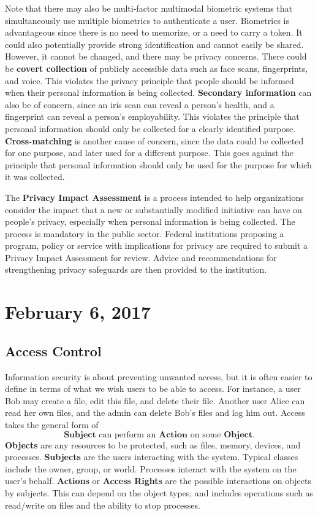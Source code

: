 \documentclass[11pt]{article}
\theoremstyle{plain} %
\theoremstyle{definition}
\theoremstyle{example}
\theoremstyle{remark}
\begin{document}
Note that there may also be multi-factor multimodal biometric systems that simultaneously use multiple biometrics to authenticate a user. Biometrics is advantageous since there is no need to memorize, or a need to carry a token. It could also potentially provide strong identification and cannot easily be shared. However, it cannot be changed, and there may be privacy concerns. There could be \textbf{covert collection} of publicly accessible data such as face scans, fingerprints, and voice. This violates the privacy principle that people should be informed when their personal information is being collected. \textbf{Secondary information} can also be of concern, since an iris scan can reveal a person's health, and a fingerprint can reveal a person's employability. This violates the principle that personal information should only be collected for a clearly identified purpose. \textbf{Cross-matching} is another cause of concern, since the data could be collected for one purpose, and later used for a different purpose. This goes against the principle that personal information should only be used for the purpose for which it was collected. 

The \textbf{Privacy Impact Assessment} is a process intended to help organizations consider the impact that a new or substantially modified initiative can have on people's privacy, especially when personal information is being collected. The process is mandatory in the public sector. Federal institutions proposing a program, policy or service with implications for privacy are required to submit a Privacy Impact Assessment for review. Advice and recommendations for strengthening privacy safeguards are then provided to the institution. 

\section{February 6, 2017}
\subsection{Access Control}

Information security is about preventing unwanted access, but it is often easier to define in terms of what we wish users to be able to access. For instance, a user Bob may create a file, edit this file, and delete their file. Another user Alice can read her own files, and the admin can delete Bob's files and log him out. Access takes the general form of 
$$\textbf{Subject}\text{ can perform an } \textbf{Action}\text{ on some } \textbf{Object}.$$
\textbf{Objects} are any resources to be protected, such as files, memory, devices, and processes. \textbf{Subjects} are the users interacting with the system. Typical classes include the owner, group, or world. Processes interact with the system on the user's behalf. \textbf{Actions} or \textbf{Access Rights} are the possible interactions on objects by subjects. This can depend on the object types, and includes operations such as read/write on files and the ability to stop processes. 
\end{document}
